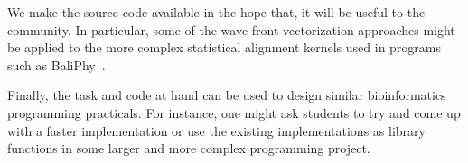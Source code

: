 \documentclass[runningheads,a4paper]{llncs}
\begin{document}
We make the source code available in the hope that, it will be useful to the community. 
In particular, some of the wave-front vectorization approaches might be applied to the more complex statistical alignment kernels used in programs 
such as BaliPhy~\cite{suchard2006bali}.

Finally, the task and code at hand can be used to design similar bioinformatics programming practicals. For instance, one might ask students to try and 
come up with a faster implementation or use the existing implementations as library functions in some larger and more complex programming project.









\end{document}

